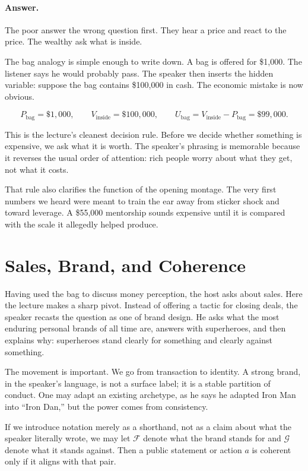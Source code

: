 \paragraph{Answer.} The poor answer the wrong question first. They hear a price and react to the price. The wealthy ask what is inside.

The bag analogy is simple enough to write down. A bag is offered for \$1{,}000. The listener says he would probably pass. The speaker then inserts the hidden variable: suppose the bag contains \$100{,}000 in cash. The economic mistake is now obvious.

\begin{equation}
P_{\text{bag}}=\$1{,}000,
\qquad
V_{\text{inside}}=\$100{,}000,
\qquad
U_{\text{bag}}=V_{\text{inside}}-P_{\text{bag}}=\$99{,}000.
\end{equation}

This is the lecture's cleanest decision rule. Before we decide whether something is expensive, we ask what it is worth. The speaker's phrasing is memorable because it reverses the usual order of attention: rich people worry about what they get, not what it costs.

That rule also clarifies the function of the opening montage. The very first numbers we heard were meant to train the ear away from sticker shock and toward leverage. A \$55{,}000 mentorship sounds expensive until it is compared with the scale it allegedly helped produce.

\section{Sales, Brand, and Coherence}

Having used the bag to discuss money perception, the host asks about sales. Here the lecture makes a sharp pivot. Instead of offering a tactic for closing deals, the speaker recasts the question as one of brand design. He asks what the most enduring personal brands of all time are, answers with superheroes, and then explains why: superheroes stand clearly for something and clearly against something.

The movement is important. We go from transaction to identity. A strong brand, in the speaker's language, is not a surface label; it is a stable partition of conduct. One may adapt an existing archetype, as he says he adapted Iron Man into ``Iron Dan,'' but the power comes from consistency.

If we introduce notation merely as a shorthand, not as a claim about what the speaker literally wrote, we may let \(\mathcal{F}\) denote what the brand stands for and \(\mathcal{G}\) denote what it stands against. Then a public statement or action \(a\) is coherent only if it aligns with that pair.

